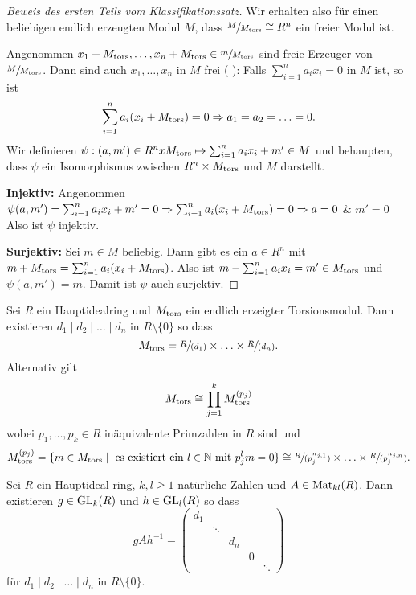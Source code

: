 \begin{proof}[Beweis des ersten Teils vom Klassifikationssatz]
	Wir erhalten also für einen beliebigen endlich erzeugten Modul $M$, dass $\sfrac{M}{M_{\operatorname{tors}}} \cong R^{n}$ ein freier Modul ist.

	Angenommen $x_1 + M_{\operatorname{tors}}, \ldots, x_{n} + M_{\operatorname{tors}} \in \sfrac{m}{M_{\operatorname{tors}}}$ sind freie Erzeuger von $\sfrac{M}{M_{\operatorname{tors}}}$.
	Dann sind auch $x_1,\ldots,x_{n}$ in $M$ frei (%
	): Falls $\sum_{i=1}^{n} a_{i} x_{i} = 0$ in $M$ ist, so ist
	\[
		\sum_{i=1}^{n} a_{i} (x_{i} + M_{\operatorname{tors}}) = 0 \Rightarrow a_1 = a_2 = \ldots = 0
	.\] 
	Wir definieren $\psi: (a,m') \in R^{n} x M_{\operatorname{tors}} \mapsto  \sum_{i=1}^{n} a_{i} x_{i} + m' \in M$ und behaupten,
	dass $\psi$ ein Isomorphismus zwischen $R^{n} \times M_{\operatorname{tors}}$ und $M$ darstellt.

	\textbf{Injektiv:} Angenommen $\psi(a,m') = \sum_{i=1}^{n} a_{i} x_{i} + m' = 0 \Rightarrow \sum_{i=1}^{n} a_{i} (x_{i} + M_{\operatorname{tors}}) = 0 \Rightarrow a = 0$ \& $m' = 0$ 
	Also ist $\psi$ injektiv.

	\textbf{Surjektiv:} Sei $m \in M$ beliebig. Dann gibt es ein $a \in R^{n}$ mit $m + M_{\operatorname{tors}} = \sum_{i=1}^{n} a_{i} (x_{i} + M_{\operatorname{tors}})$.
	Also ist $m - \sum_{i = 1}^{n} a_{i} x_{i} = m' \in M_{\operatorname{tors}}$ und $\psi(a,m') = m$.
	Damit ist $\psi$ auch surjektiv.
\end{proof}

\begin{theorem}
	Sei $R$ ein Hauptidealring und $M_{\operatorname{tors}}$ ein endlich erzeigter Torsionsmodul. 
	Dann existieren $d_1 \mid d_2 \mid \ldots \mid d_{n}$ in $R \setminus \{0\} $ so dass
	\[
		M_{\operatorname{tors}} = \sfrac{R}{(d_1)} \times \ldots \times \sfrac{R}{(d_{n})}
	.\] 
	Alternativ gilt
	\[
		M_{\operatorname{tors}} \cong \prod_{j=1}^{k} M_{\operatorname{tors}}^{(p_{j})}
	\]
	wobei $p_1,\ldots,p_{k} \in R$ inäquivalente Primzahlen in $R$ sind und %
	\[
		M_{\operatorname{tors}}^{(p_{j})} = \{m \in M_{\operatorname{tors}} \mid \text{ es existiert ein $l \in \mathbb{N}$ mit } p_{j}^{l} m = 0\} \cong 
		\sfrac{R}{(p_{j}^{n_{j,1}})} \times \ldots \times \sfrac{R}{(p_{j}^{n_{j,n}})}
	.\] 
\end{theorem}

\begin{theorem}
	Sei $R$ ein Hauptideal ring, $k,l \geq 1$ natürliche Zahlen und $A \in \operatorname{Mat}_{kl}(R)$.
	Dann existieren $g \in \operatorname{GL}_{k}(R)$ und $h \in \operatorname{GL}_{l}(R)$ so dass
	\[
	g A h^{-1} = \begin{pmatrix} 
		d_1 \\
		& \ddots \\
		& & d_{n} \\
		& & & 0 \\
		& & & & \ddots
	\end{pmatrix} 
	\]
	für $d_1 \mid d_2 \mid \ldots \mid d_{n}$ in $R \setminus \{0\} $.
\end{theorem}

